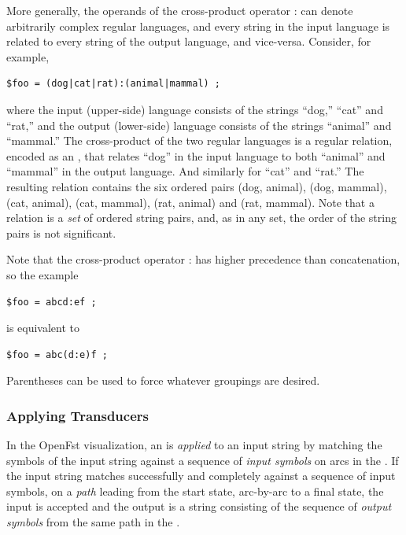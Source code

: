 More generally, the operands of the cross-product operator : can denote arbitrarily complex regular languages, 
and every string in the input language is related to every string of the
output language, and vice-versa.  Consider, for example,

\begin{Verbatim}
$foo = (dog|cat|rat):(animal|mammal) ;
\end{Verbatim}

\noindent
where the input (upper-side) language consists of the strings ``dog,'' ``cat'' and ``rat,'' and the output (lower-side)
language consists of the strings ``animal'' and ``mammal.''  The
cross-product of the two regular languages is a regular relation, encoded as an \fst{}, that
relates ``dog'' in the input language to both ``animal'' and ``mammal'' in the output
language.  And similarly for ``cat'' and ``rat.''  The resulting relation
contains the six ordered pairs (dog, animal), (dog, mammal), (cat, animal), (cat,
mammal), (rat, animal) and (rat, mammal).  Note that a relation is a
\emph{set} of ordered string
pairs, and, as in any set, the order of the string pairs is not significant.

Note that the cross-product operator : has higher precedence than concatenation, so  the example

\begin{Verbatim}
$foo = abcd:ef ;
\end{Verbatim}

\noindent
is equivalent to

\begin{Verbatim}
$foo = abc(d:e)f ;
\end{Verbatim}

\noindent
Parentheses can be used to force whatever groupings are desired.


\subsubsection{Applying Transducers}

In the OpenFst visualization, an \fst{} is \emph{applied} to an input string by
matching the symbols of the input string against a sequence of
\emph{input symbols} on arcs in the \fst{}.  If the input string matches successfully
and completely against a sequence of input symbols, on a \emph{path} leading from the start state,
arc-by-arc to a final state, the input is accepted and
the output is a string consisting of the sequence of \emph{output symbols} from the same path 
in the \fst{}.  


